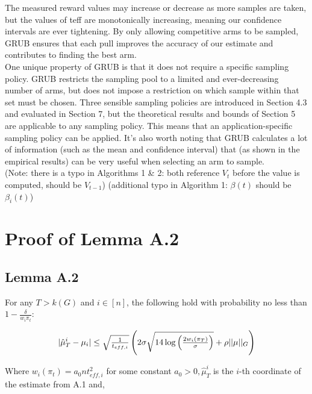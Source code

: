 \documentclass{article}[12pt]
\begin{document}
The measured reward values may increase or decrease as more samples are taken, but the values of teff are monotonically increasing, meaning our confidence intervals are ever tightening.
By only allowing competitive arms to be sampled, GRUB ensures that each pull improves the accuracy of our estimate and contributes to finding the best arm. \\

One unique property of GRUB is that it does not require a specific sampling policy.
GRUB restricts the sampling pool to a limited and ever-decreasing number of arms, but does not impose a restriction on which sample within that set must be chosen.
Three sensible sampling policies are introduced in Section 4.3 and evaluated in Section 7, but the theoretical results and bounds of Section 5 are applicable to any sampling policy.
This means that an application-specific sampling policy can be applied.
It’s also worth noting that GRUB calculates a lot of information (such as the mean and confidence interval) that (as shown in the empirical results) can be very useful when selecting an arm to sample. \\

(Note: there is a typo in Algorithms 1 \& 2: both reference $V_t$ before the value is computed, should be $V_{t-1}$)
(additional typo in Algorithm 1:  $\beta(t)$ should be $\beta_i(t)$)

\pagebreak

\section{Proof of Lemma A.2}

\subsection{Lemma A.2}

For any $T > k(G)$ and $i \in [n]$, the following hold with probability no less than $1- \tfrac{\delta}{w_i \pi_t}$:

\begin{equation}
 |\hat{\mu}^{i}_{T} - \mu_{i}| \leq \sqrt{\tfrac{1}{t_{eff,i}}}\left( 2\sigma \sqrt{14 \log \left( \tfrac{2 w_i (\boldmath{\pi_T})}{\sigma} \right)} + \rho ||\boldmath{\mu}||_G \right)
\end{equation}


Where $w_i(\pi_t) = a_0 n t_{eff,i}^2$ for some constant $a_0 > 0, \hat{\mu}^i_T$ is the $i$-th coordinate of the estimate from A.1 and,
\end{document}
